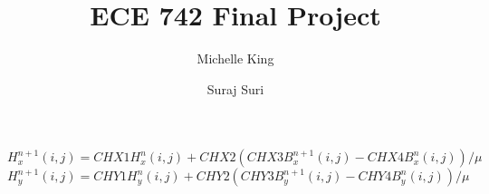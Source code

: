 \message{ !name(ECE742Project.tex)}\documentclass{article}
\title{ECE 742 Final Project}
\author{
  Michelle King
  \and
  Suraj Suri
  }
\begin{document}
 \begin{equation}
 H_{x}^{n+1}(i,j) = CHX1  H_{x}^{n}(i,j) + CHX2  (CHX3 B_{x}^{n+1}(i,j)-CHX4 B_{x}^{n}(i,j))/\mu
 \end{equation}
 \begin{equation}
 H_{y}^{n+1}(i,j) = CHY1  H_{y}^{n}(i,j) + CHY2  (CHY3 B_{y}^{n+1}(i,j)-CHY4 B_{y}^{n}(i,j))/\mu
 \end{equation} 
\end{document}
